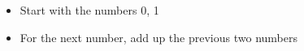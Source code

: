 \documentclass[preview]{standalone}
\begin{document}
\begin{center}
\begin{itemize} \item Start with the numbers 0, 1 \\ \item For the next number, add up the previous two numbers \end{itemize}
\end{center}
\end{document}

